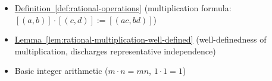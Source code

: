 \begin{dependencies}
\begin{itemize}
  \item \hyperref[def:rational-operations]{Definition~\ref*{def:rational-operations}}
        \textnormal{(multiplication formula: $[(a,b)]\cdot[(c,d)]:=[(ac,bd)]$)}
  \item \hyperref[lem:rational-multiplication-well-defined]{Lemma~\ref*{lem:rational-multiplication-well-defined}}
        \textnormal{(well-definedness of multiplication, discharges representative independence)}
  \item Basic integer arithmetic ($m\cdot n = mn$, $1\cdot 1 = 1$)
\end{itemize}
\end{dependencies}
